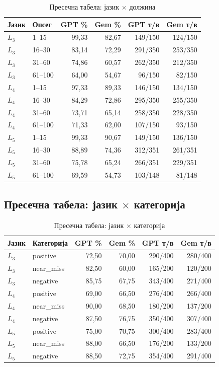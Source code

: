 \documentclass[12pt,a4paper]{article}
\theoremstyle{definition}
\begin{document}
\begin{table}[H]
\centering
\begin{tabular}{llrrrr}
\toprule
\textbf{Јазик} & \textbf{Опсег} & \textbf{GPT \%} & \textbf{Gem \%} & \textbf{GPT т/в} & \textbf{Gem т/в} \\
\midrule
$L_3$ & 1--15   & 99,33 & 82,67 & 149/150 & 124/150 \\
$L_3$ & 16--30  & 83,14 & 72,29 & 291/350 & 253/350 \\
$L_3$ & 31--60  & 74,86 & 60,57 & 262/350 & 212/350 \\
$L_3$ & 61--100 & 64,00 & 54,67 & 96/150  & 82/150  \\
\midrule
$L_4$ & 1--15   & 97,33 & 89,33 & 146/150 & 134/150 \\
$L_4$ & 16--30  & 84,29 & 72,86 & 295/350 & 255/350 \\
$L_4$ & 31--60  & 73,71 & 65,14 & 258/350 & 228/350 \\
$L_4$ & 61--100 & 71,33 & 62,00 & 107/150 & 93/150  \\
\midrule
$L_5$ & 1--15   & 99,33 & 90,67 & 149/150 & 136/150 \\
$L_5$ & 16--30  & 88,89 & 74,36 & 312/351 & 261/351 \\
$L_5$ & 31--60  & 75,78 & 65,24 & 266/351 & 229/351 \\
$L_5$ & 61--100 & 69,59 & 54,73 & 103/148 & 81/148  \\
\bottomrule
\end{tabular}
\caption{Пресечна табела: јазик $\times$ должина}
\end{table}

\subsection{Пресечна табела: јазик $\times$ категорија}

\begin{table}[H]
\centering
\begin{tabular}{llrrrr}
\toprule
\textbf{Јазик} & \textbf{Категорија} & \textbf{GPT \%} & \textbf{Gem \%} & \textbf{GPT т/в} & \textbf{Gem т/в} \\
\midrule
$L_3$ & positive  & 72,50 & 70,00 & 290/400 & 280/400 \\
$L_3$ & near\_miss & 82,50 & 60,00 & 165/200 & 120/200 \\
$L_3$ & negative  & 85,75 & 67,75 & 343/400 & 271/400 \\
\midrule
$L_4$ & positive  & 69,00 & 66,50 & 276/400 & 266/400 \\
$L_4$ & near\_miss & 90,00 & 68,50 & 180/200 & 137/200 \\
$L_4$ & negative  & 87,50 & 76,75 & 350/400 & 307/400 \\
\midrule
$L_5$ & positive  & 75,00 & 70,75 & 300/400 & 283/400 \\
$L_5$ & near\_miss & 88,00 & 66,50 & 176/200 & 133/200 \\
$L_5$ & negative  & 88,50 & 72,75 & 354/400 & 291/400 \\
\bottomrule
\end{tabular}
\caption{Пресечна табела: јазик $\times$ категорија}
\end{table}
\end{document}
